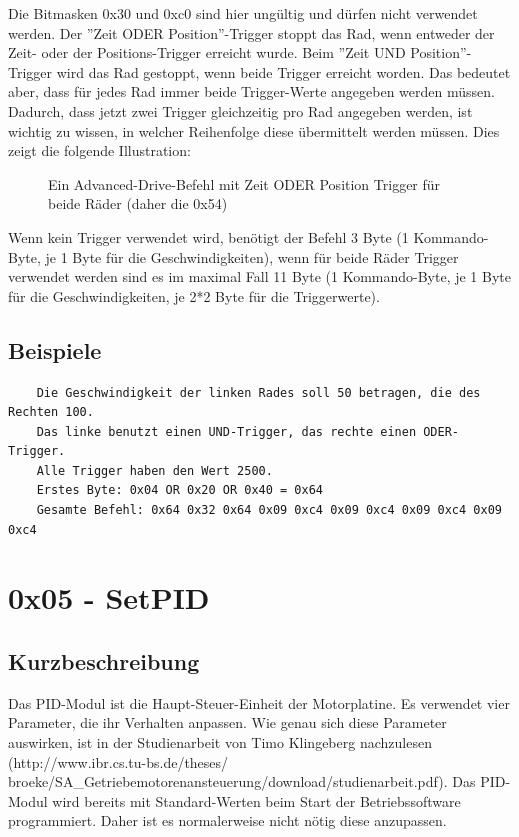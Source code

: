 \documentclass[a4paper]{article}
\begin{document}
	Die Bitmasken 0x30 und 0xc0 sind hier ungültig und dürfen nicht verwendet werden.
	Der ''Zeit ODER Position''-Trigger stoppt das Rad, wenn entweder der Zeit- oder der
	Positions-Trigger erreicht wurde. Beim ''Zeit UND Position''-Trigger wird das Rad
	gestoppt, wenn beide Trigger erreicht worden. Das bedeutet aber, dass für jedes Rad
	immer beide Trigger-Werte angegeben werden müssen. Dadurch, dass jetzt zwei Trigger
	gleichzeitig pro Rad angegeben werden, ist wichtig zu wissen, in welcher Reihenfolge
	diese übermittelt werden müssen. Dies zeigt die folgende Illustration:
	\begin{figure}[!ht]
		\centering
		\caption{Ein Advanced-Drive-Befehl mit Zeit ODER Position Trigger für beide Räder (daher die 0x54)}
	\end{figure}
	Wenn kein Trigger verwendet wird, benötigt der Befehl 3 Byte (1 Kommando-Byte,
	je 1 Byte für die Geschwindigkeiten), wenn für beide Räder Trigger verwendet
	werden sind es im maximal Fall 11 Byte (1 Kommando-Byte, je 1 Byte für die
	Geschwindigkeiten, je 2*2 Byte für die Triggerwerte).

	\subsection{Beispiele}
	\begin{verbatim}
	Die Geschwindigkeit der linken Rades soll 50 betragen, die des Rechten 100.
	Das linke benutzt einen UND-Trigger, das rechte einen ODER-Trigger.
	Alle Trigger haben den Wert 2500.
	Erstes Byte: 0x04 OR 0x20 OR 0x40 = 0x64
	Gesamte Befehl: 0x64 0x32 0x64 0x09 0xc4 0x09 0xc4 0x09 0xc4 0x09 0xc4
	\end{verbatim}
	\pagebreak


	\section{0x05 - SetPID}

	\subsection{Kurzbeschreibung}

	Das PID-Modul ist die Haupt-Steuer-Einheit der Motorplatine.
	Es verwendet vier Parameter, die ihr Verhalten anpassen. Wie
	genau sich diese Parameter auswirken, ist in der Studienarbeit
	von Timo Klingeberg nachzulesen (http://www.ibr.cs.tu-bs.de/theses/
	broeke/SA\_Getriebemotorenansteuerung/download/studienarbeit.pdf).
	Das PID-Modul wird bereits mit Standard-Werten beim Start der
	Betriebssoftware programmiert. Daher ist es normalerweise nicht
	nötig diese anzupassen.
\end{document}
